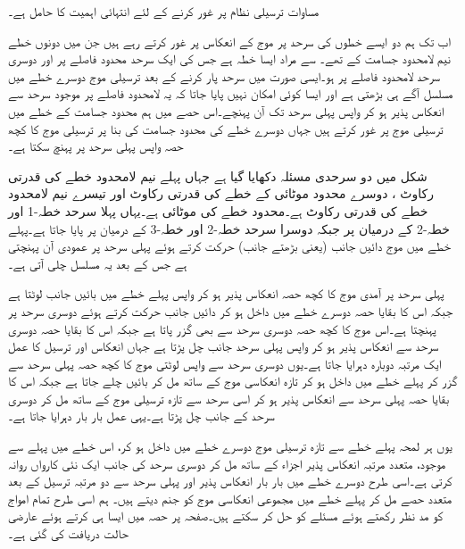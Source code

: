 مساوات  ترسیلی نظام پر غور کرنے کے لئے انتہائی اہمیت کا حامل ہے۔

اب تک ہم دو ایسے خطوں کی سرحد پر موج کے انعکاس پر غور کرتے رہے ہیں جن میں دونوں خطے نیم لامحدود جسامت کے تھے۔ سے مراد ایسا خطہ ہے جس کی ایک سرحد محدود فاصلے پر اور دوسری سرحد لامحدود فاصلے پر ہو۔ایسی صورت میں سرحد پار کرنے کے بعد ترسیلی موج دوسرے خطے میں مسلسل آگے ہی بڑھتی ہے اور ایسا کوئی امکان نہیں پایا جاتا کہ یہ لامحدود فاصلے پر موجود  سرحد سے انعکاس پذیر ہو کر واپس پہلی سرحد تک آن پہنچے۔اس حصے میں ہم محدود جسامت کے خطے میں ترسیلی موج پر غور کرتے ہیں جہاں دوسرے خطے کی محدود جسامت کی بنا پر ترسیلی موج کا کچھ حصہ واپس پہلی سرحد پر پہنچ سکتا ہے۔

شکل  میں دو سرحدی مسئلہ دکھایا گیا ہے جہاں پہلے نیم لامحدود خطے کی قدرتی رکاوٹ ، دوسرے محدود موٹائی کے خطے کی قدرتی رکاوٹ  اور تیسرے نیم لامحدود خطے کی قدرتی رکاوٹ  ہے۔محدود خطے کی موٹائی  ہے۔یہاں پہلا سرحد خطہ-1 اور خطہ-2 کے درمیان  پر جبکہ دوسرا سرحد خطہ-2 اور خطہ-3 کے درمیان  پر پایا جاتا ہے۔پہلے خطے میں موج دائیں جانب (یعنی بڑھتے  جانب) حرکت کرتے ہوئے پہلی سرحد پر عمودی آن پہنچتی ہے جس کے بعد یہ مسلسل چلی آتی ہے۔

پہلی سرحد پر آمدی موج کا کچھ حصہ انعکاس پذیر ہو کر واپس پہلے خطے میں بائیں جانب لوٹتا ہے جبکہ اس کا بقایا حصہ دوسرے خطے میں داخل ہو کر دائیں جانب حرکت کرتے ہوئے دوسری سرحد پر پہنچتا ہے۔اس موج کا کچھ حصہ دوسری سرحد سے بھی گزر پاتا ہے جبکہ اس کا بقایا حصہ دوسری سرحد سے انعکاس پذیر ہو کر واپس پہلی سرحد جانب چل پڑتا ہے جہاں انعکاس اور ترسیل کا عمل ایک مرتبہ دوبارہ دہرایا جاتا ہے۔یوں دوسری سرحد سے واپس لوٹتی موج کا کچھ حصہ پہلی سرحد سے گزر کر پہلے خطے میں داخل ہو کر تازہ انعکاسی موج کے ساتھ مل کر بائیں چلے جاتا ہے جبکہ اس کا بقایا حصہ پہلی سرحد سے انعکاس پذیر ہو کر اسی سرحد سے تازہ ترسیلی موج کے ساتھ مل کر  دوسری سرحد کے جانب چل پڑتا ہے۔یہی عمل بار بار دہرایا جاتا ہے۔

یوں ہر لمحہ پہلے خطے سے تازہ ترسیلی موج دوسرے خطے میں داخل ہو کر، اس خطے میں پہلے سے موجود، متعدد مرتبہ انعکاس پذیر اجزاء کے ساتھ مل کر دوسری سرحد کی جانب ایک نئی کارواں روانہ کرتی ہے۔اسی طرح دوسرے خطے میں بار بار انعکاس پذیر اور پہلی سرحد سے دو مرتبہ ترسیل کے بعد متعدد حصے مل کر پہلے خطے میں مجموعی انعکاسی موج کو جنم دیتے ہیں۔  
ہم اسی طرح تمام امواج کو مد نظر رکھتے ہوئے مسئلے کو حل کر سکتے ہیں۔صفحہ  پر حصہ  میں ایسا ہی کرتے ہوئے عارضی حالت دریافت کی گئی ہے۔

